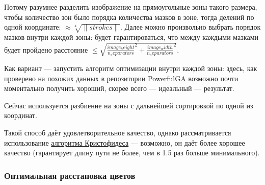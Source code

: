 Потому разумнее разделить изображение на прямоугольные зоны такого размера,
чтобы количество зон было порядка количества мазков в зоне, тогда делений по одной координате: $\approx \sqrt[4]{\lVert strokes \rVert}$.
Далее можно произвольно выбрать порядок мазков внутри каждой зоны: будет гарантироваться, что между каждыми мазками будет пройдено расстояние
$\leq \sqrt{\frac{image_height}{n_separators}^2 + \frac{image_width}{n_separators}^2}$.

Как вариант — запустить алгоритм оптимизации внутри каждой зоны: здесь, как проверено на похожих данных в репозитории PowerfulGA
возможно почти моментально получить хороший, скорее всего — идеальный — результат.

Сейчас используется разбиение на зоны с дальнейшей сортировкой по одной из координат.

Такой способ даёт удовлетворительное качество, однако рассматривается использование
\href{https://en.wikipedia.org/wiki/Christofides_algorithm}{алгоритма Кристофидеса} —
возможно, он даёт более хорошее качество (гарантирует длину пути не более, чем в 1.5 раз больше минимального).

\subsubsection{Оптимальная расстановка цветов}

